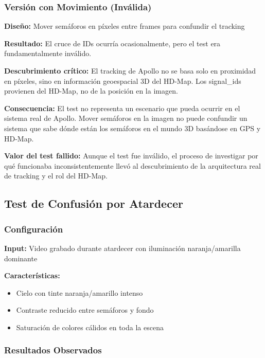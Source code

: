 \subsubsection{Versión con Movimiento (Inválida)}

\textbf{Diseño:} Mover semáforos en píxeles entre frames para confundir el tracking

\textbf{Resultado:} El cruce de IDs ocurría ocasionalmente, pero el test era fundamentalmente inválido.

\textbf{Descubrimiento crítico:} El tracking de Apollo no se basa solo en proximidad en píxeles, sino en información geoespacial 3D del HD-Map. Los signal\_ids provienen del HD-Map, no de la posición en la imagen.

\textbf{Consecuencia:} El test no representa un escenario que pueda ocurrir en el sistema real de Apollo. Mover semáforos en la imagen no puede confundir un sistema que sabe dónde están los semáforos en el mundo 3D basándose en GPS y HD-Map.

\textbf{Valor del test fallido:} Aunque el test fue inválido, el proceso de investigar por qué funcionaba inconsistentemente llevó al descubrimiento de la arquitectura real de tracking y el rol del HD-Map.

\subsection{Test de Confusión por Atardecer}

\subsubsection{Configuración}

\textbf{Input:} Video grabado durante atardecer con iluminación naranja/amarilla dominante

\textbf{Características:}
\begin{itemize}
    \item Cielo con tinte naranja/amarillo intenso
    \item Contraste reducido entre semáforos y fondo
    \item Saturación de colores cálidos en toda la escena
\end{itemize}

\subsubsection{Resultados Observados}

